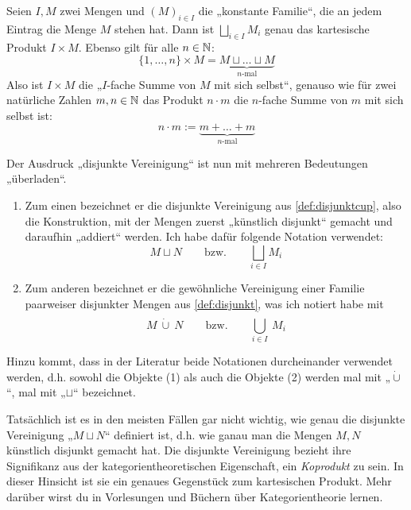     
\begin{bem}
    Seien $I,M$ zwei Mengen und $(M)_{i\in I}$ die „konstante Familie“, die an jedem Eintrag die Menge $M$ stehen hat. Dann ist $\bigsqcup_{i\in I} M_i$ genau das kartesische Produkt $I\times M$. Ebenso gilt für alle $n\in \mathbb N$:
        \[ \{1,\dots , n\} \times M = \underbrace{M\sqcup\ldots\sqcup M}_{\text{$n$-mal}} \]
    Also ist $I\times M$ die „$I$-fache Summe von $M$ mit sich selbst“, genauso wie für zwei natürliche Zahlen $m,n\in \mathbb N$ das Produkt $n\cdot m$ die $n$-fache Summe von $m$ mit sich selbst ist:
        \[ n\cdot m := \underbrace{m +\ldots + m}_{\text{$n$-mal}}\]
\end{bem}


\begin{vorschau}
    Der Ausdruck „disjunkte Vereinigung“ ist nun mit mehreren Bedeutungen „überladen“.
    \begin{enumerate}[(1)]
        \item Zum einen bezeichnet er die disjunkte Vereinigung aus \cref{def:disjunktcup}, also die Konstruktion, mit der Mengen zuerst „künstlich disjunkt“ gemacht und daraufhin „addiert“ werden. Ich habe dafür folgende Notation verwendet:
            \[ M\sqcup N \qquad\text{bzw.}\qquad \bigsqcup_{i\in I} M_i \]
        \item Zum anderen bezeichnet er die gewöhnliche Vereinigung einer Familie paarweiser disjunkter Mengen aus \cref{def:disjunkt}, was ich notiert habe mit
            \[ M\ \dot\cup\ N \qquad\text{bzw.}\qquad   \dot{\bigcup_{i\in I}}\ M_i \]
    \end{enumerate}
    Hinzu kommt, dass in der Literatur beide Notationen durcheinander verwendet werden, d.h. sowohl die Objekte (1) als auch die Objekte (2) werden mal mit „$\dot\cup$“, mal mit „$\sqcup$“ bezeichnet.
    
    Tatsächlich ist es in den meisten Fällen gar nicht wichtig, wie genau die disjunkte Vereinigung „$M \sqcup N$“ definiert ist, d.h. wie ganau man die Mengen $M,N$ künstlich disjunkt gemacht hat. Die disjunkte Vereinigung bezieht ihre Signifikanz aus der kategorientheoretischen Eigenschaft, ein \emph{Koprodukt} zu sein. In dieser Hinsicht ist sie ein genaues Gegenstück zum kartesischen Produkt. Mehr darüber wirst du in Vorlesungen und Büchern über Kategorientheorie lernen.
\end{vorschau}





\clearpage

